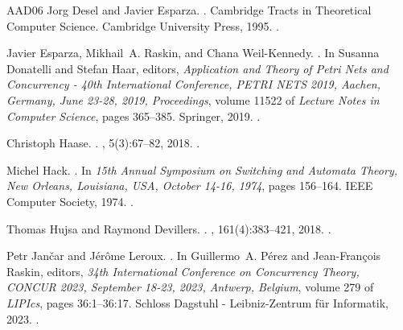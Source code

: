 \documentclass[11pt,a4paper]{amsart}
\theoremstyle{plain}
\theoremstyle{definition}
\theoremstyle{defC}
\theoremstyle{thmC}
\begin{document}
\begin{thebibliography}{AAD{\etalchar{+}}06}
Jorg Desel and Javier Esparza.
.
\newblock Cambridge Tracts in Theoretical Computer Science. Cambridge
  University Press, 1995.
\newblock \href {https://doi.org/10.1017/CBO9780511526558}
  {}.

Javier Esparza, Mikhail~A. Raskin, and Chana Weil{-}Kennedy.
.
\newblock In Susanna Donatelli and Stefan Haar, editors, {\em Application and
  Theory of Petri Nets and Concurrency - 40th International Conference, {PETRI}
  {NETS} 2019, Aachen, Germany, June 23-28, 2019, Proceedings}, volume 11522 of
  {\em Lecture Notes in Computer Science}, pages 365--385. Springer, 2019.
\newblock \href {https://doi.org/10.1007/978-3-030-21571-2\_20}
  {}.

Christoph Haase.
.
, 5(3):67--82, 2018.
\newblock \href {https://doi.org/10.1145/3242953.3242964}
  {}.

Michel Hack.
.
\newblock In {\em 15th Annual Symposium on Switching and Automata Theory, New
  Orleans, Louisiana, USA, October 14-16, 1974}, pages 156--164. {IEEE}
  Computer Society, 1974.
\newblock \href {https://doi.org/10.1109/SWAT.1974.28}
  {}.

Thomas Hujsa and Raymond Devillers.
.
, 161(4):383--421, 2018.
\newblock \href {https://doi.org/10.3233/FI-2018-1708}
  {}.

Petr Jan\v{c}ar and J{\'{e}}r{\^{o}}me Leroux.
.
\newblock In Guillermo~A. P{\'{e}}rez and Jean{-}Fran{\c{c}}ois Raskin,
  editors, {\em 34th International Conference on Concurrency Theory, {CONCUR}
  2023, September 18-23, 2023, Antwerp, Belgium}, volume 279 of {\em LIPIcs},
  pages 36:1--36:17. Schloss Dagstuhl - Leibniz-Zentrum f{\"{u}}r Informatik,
  2023.
\newblock \href {https://doi.org/10.4230/LIPICS.CONCUR.2023.36}
  {}.


\end{thebibliography}
\end{document}
